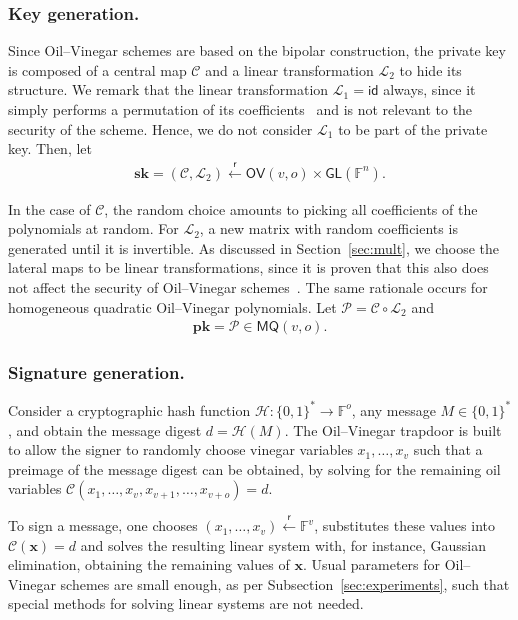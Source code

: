 \documentclass[draft, 12pt, a4paper, oneside]{memoir}
\newcommand{\random}{\overset{\mathsf{r}}{\gets}}
\theoremstyle{definition}
\begin{document}
\subsubsection{Key generation.}

Since Oil--Vinegar schemes are based on the bipolar construction, the private key is composed of a central map $\mathcal{C}$ and a linear transformation $\mathcal{L}_{2}$ to hide its structure. We remark that the linear transformation $\mathcal{L}_{1} = \mathsf{id}$ always, since it simply performs a permutation of its coefficients~\cite[p. 71]{Thomae:201306} and is not relevant to the security of the scheme. Hence, we do not consider $\mathcal{L}_{1}$ to be part of the private key. Then, let
\begin{align}
  \mathbf{sk} = (\mathcal{C}, \mathcal{L}_{2})
    \random \mathsf{OV}(v, o) \times \mathsf{GL}(\mathbb{F}^{n}).
\end{align}

In the case of $\mathcal{C}$, the random choice amounts to picking all coefficients of the polynomials at random. For $\mathcal{L}_{2}$, a new matrix with random coefficients is generated until it is invertible. As discussed in Section~\ref{sec:mult}, we choose the lateral maps to be linear transformations, since it is proven that this also does not affect the security of Oil--Vinegar schemes~\cite[Section 3.1]{Braeken:200502}. The same rationale occurs for homogeneous quadratic Oil--Vinegar polynomials. Let $\mathcal{P} = \mathcal{C} \circ \mathcal{L}_{2}$ and
\begin{align}
  \mathbf{pk} = \mathcal{P} \in \mathsf{MQ}(v, o).
\end{align}

\subsubsection{Signature generation.}

Consider a cryptographic hash function $\mathcal{H} : \{0, 1\}^{*} \to \mathbb{F}^{o}$, any message $M \in \{0, 1\}^{*}$, and obtain the message digest $d = \mathcal{H}(M)$. The Oil--Vinegar trapdoor is built to allow the signer to randomly choose vinegar variables $x_{1}, \dots, x_{v}$ such that a preimage of the message digest can be obtained, by solving for the remaining oil variables $\mathcal{C}(x_{1}, \dots, x_{v}, x_{v + 1}, \dots, x_{v + o}) = d$. 

To sign a message, one chooses $(x_{1}, \dots, x_{v}) \random \mathbb{F}^{v}$, substitutes these values into $\mathcal{C}(\mathbf{x}) = d$ and solves the resulting linear system with, for instance, Gaussian elimination, obtaining the remaining values of $\mathbf{x}$. Usual parameters for Oil--Vinegar schemes are small enough, as per Subsection~\ref{sec:experiments}, such that special methods for solving linear systems are not needed. 
\end{document}
